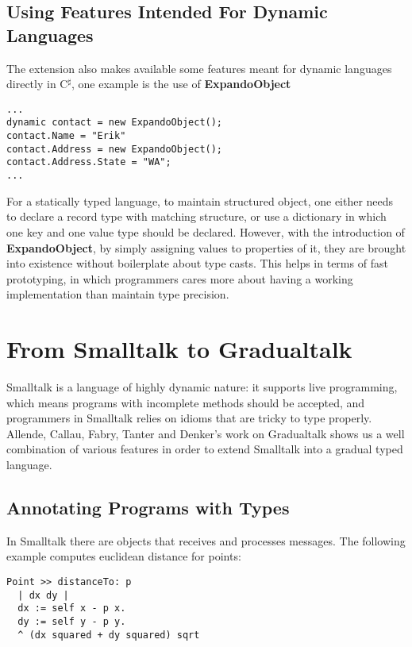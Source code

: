 \subsection{Using Features Intended For Dynamic Languages}

The extension also makes available some features meant for dynamic languages
directly in C$^\sharp$, one example is the use of \textbf{ExpandoObject}

\begin{verbatim}
...
dynamic contact = new ExpandoObject();
contact.Name = "Erik"
contact.Address = new ExpandoObject();
contact.Address.State = "WA";
...
\end{verbatim}

For a statically typed language, to maintain structured object,
one either needs to declare a record type with matching structure,
or use a dictionary in which one key and one value type should be declared.
However, with the introduction of \textbf{ExpandoObject},
by simply assigning values to properties of it,
they are brought into existence without boilerplate about type casts.
This helps in terms of fast prototyping, in which programmers cares more about
having a working implementation than maintain type precision.

\section{From Smalltalk to Gradualtalk}

Smalltalk is a language of highly dynamic nature:
it supports live programming, which means programs with incomplete
methods should be accepted, and programmers in Smalltalk relies on
idioms that are tricky to type properly.
Allende, Callau, Fabry, Tanter and Denker's work on Gradualtalk shows
us a well combination of various features in order to extend Smalltalk
into a gradual typed language.

\subsection{Annotating Programs with Types}

In Smalltalk there are objects that receives and processes messages.
The following example computes euclidean distance for points:

\begin{verbatim}
Point >> distanceTo: p
  | dx dy |
  dx := self x - p x.
  dy := self y - p y.
  ^ (dx squared + dy squared) sqrt
\end{verbatim}

